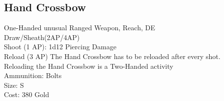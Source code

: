 \subsection{Hand Crossbow}\label{weapon:handCrossbow}
One-Handed unusual Ranged Weapon,  Reach, DE\\
Draw/Sheath(2AP/4AP)\\
Shoot (1 AP): 1d12 Piercing Damage\\
Reload (3 AP) The Hand Crossbow has to be reloaded after every shot.\\
Reloading the Hand Crossbow is a Two-Handed activity\\
Ammunition: Bolts\\
Size: S\\
Cost: 380 Gold\\